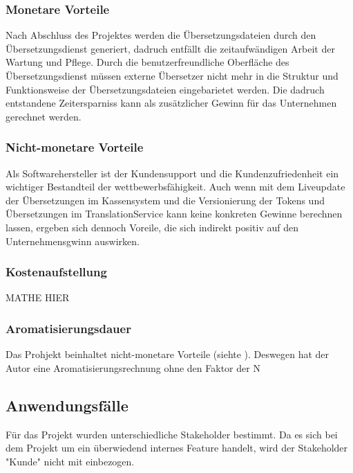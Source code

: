 \documentclass[10pt, oneside]{article}
\newcommand{\secref}[1]{\hyperref[{#1}]{\nameref{#1}}}
\begin{document}
  \subsubsection{Monetare Vorteile}\label{sec:MV}%
    Nach Abschluss des Projektes werden die Übersetzungsdateien durch den Übersetzungsdienst generiert, 
    dadruch entfällt die zeitaufwändigen Arbeit der Wartung und Pflege. 
    Durch die benutzerfreundliche Oberfläche des Übersetzungsdienst müssen externe Übersetzer 
    nicht mehr in die Struktur und Funktionsweise der Übersetzungsdateien eingebarietet werden. Die dadruch entstandene Zeitersparniss 
    kann als zusätzlicher Gewinn für das Unternehmen gerechnet werden.
  \subsubsection{Nicht-monetare Vorteile}\label{sec:notMV}%
    Als Softwarehersteller ist der Kundensupport und die Kundenzufriedenheit ein wichtiger Bestandteil der wettbewerbsfähigkeit.
    Auch wenn mit dem Liveupdate der Übersetzungen im Kassensystem und die Versionierung der Tokens 
    und Übersetzungen im TranslationService kann keine konkreten Gewinne berechnen lassen,
    ergeben sich dennoch Voreile, die sich indirekt positiv auf den Unternehmensgwinn auswirken. 
  \subsubsection{Kostenaufstellung}\label{sec:costs}%
    MATHE HIER
  \subsubsection{Aromatisierungsdauer} %
    Das Prohjekt beinhaltet nicht-monetare Vorteile (siehte \secref{sec:notMV}). Deswegen hat der Autor eine 
    Aromatisierungsrechnung ohne den Faktor der N
  \subsection{Anwendungsfälle}%
    Für das Projekt wurden unterschiedliche Stakeholder bestimmt. Da es sich bei dem Projekt um ein überwiedend internes Feature handelt, wird
    der Stakeholder "Kunde" nicht mit einbezogen.\\
\end{document}
